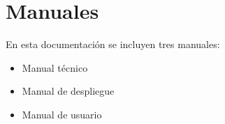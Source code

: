 
\chapter{Manuales}

En esta documentación se incluyen tres manuales:

\begin{itemize}
  \item Manual técnico
  \item Manual de despliegue
  \item Manual de usuario
\end{itemize}

\newpage



\newpage



\newpage



